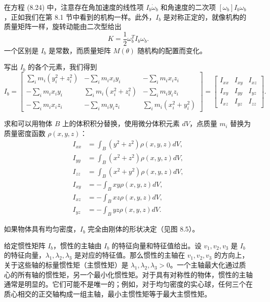 \documentclass[12pt,a4paper]{article}
\begin{document}
在方程 (8.24) 中，注意存在角加速度的线性项 $I_b \dot{\omega}_b$ 和角速度的二次项 $[\omega_b]I_b \omega_b$，正如我们在第 8.1 节中看到的机构一样。此外，$I_b$ 是对称正定的，就像机构的质量矩阵一样，旋转动能由二次型给出
\begin{equation}
K = \frac{1}{2}\omega_b^T I_b \omega_b.
\end{equation}
一个区别是 $I_b$ 是常数，而质量矩阵 $M(\theta)$ 随机构的配置而变化。

写出 $I_b$ 的各个元素，我们得到
\begin{equation}
I_b = \begin{bmatrix}
\sum_i m_i(y_i^2 + z_i^2) & -\sum_i m_i x_i y_i & -\sum_i m_i x_i z_i \\
-\sum_i m_i x_i y_i & \sum_i m_i(x_i^2 + z_i^2) & -\sum_i m_i y_i z_i \\
-\sum_i m_i x_i z_i & -\sum_i m_i y_i z_i & \sum_i m_i(x_i^2 + y_i^2)
\end{bmatrix} = \begin{bmatrix}
I_{xx} & I_{xy} & I_{xz} \\
I_{xy} & I_{yy} & I_{yz} \\
I_{xz} & I_{yz} & I_{zz}
\end{bmatrix}.
\end{equation}

求和可以用物体 $B$ 上的体积积分替换，使用微分体积元素 $dV$，点质量 $m_i$ 替换为质量密度函数 $\rho(x, y, z)$：
\begin{align}
I_{xx} &= \int_B (y^2 + z^2)\rho(x, y, z) dV, \\
I_{yy} &= \int_B (x^2 + z^2)\rho(x, y, z) dV, \\
I_{zz} &= \int_B (x^2 + y^2)\rho(x, y, z) dV, \\
I_{xy} &= -\int_B xy\rho(x, y, z) dV, \\
I_{xz} &= -\int_B xz\rho(x, y, z) dV, \\
I_{yz} &= -\int_B yz\rho(x, y, z) dV.
\end{align}

如果物体具有均匀密度，$I_b$ 完全由刚体的形状决定（见图 8.5）。

给定惯性矩阵 $I_b$，惯性的主轴由 $I_b$ 的特征向量和特征值给出。设 $v_1, v_2, v_3$ 是 $I_b$ 的特征向量，$\lambda_1, \lambda_2, \lambda_3$ 是对应的特征值。那么惯性的主轴在 $v_1, v_2, v_3$ 的方向上，关于这些轴的标量惯性矩（主惯性矩）是 $\lambda_1, \lambda_2, \lambda_3 > 0$。一个主轴最大化通过质心的所有轴的惯性矩，另一个最小化惯性矩。对于具有对称性的物体，惯性的主轴通常是明显的。它们可能不是唯一的；例如，对于均匀密度的实心球，任何三个在质心相交的正交轴构成一组主轴，最小主惯性矩等于最大主惯性矩。
\end{document}

